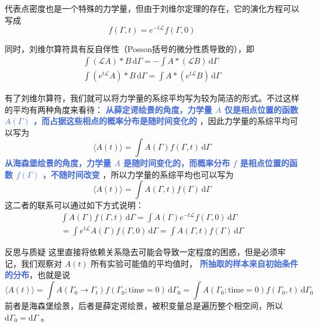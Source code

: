 代表点密度也是一个特殊的力学量，但由于刘维尔定理的存在，它的演化方程可以写成
\begin{equation}\label{equ:代表点密度的演化方程}
    f(\Gamma,t) =  e^{-t\mathcal{L}}f(\Gamma,0)
\end{equation}

同时，刘维尔算符具有反自伴性（Posson括号的微分性质导致的），即
\begin{align}\label{equ:反自伴性}
    \int (\mathcal{L}A)*B \,\mathrm{d}\Gamma= -\int A*(\mathcal{L}B) \,\mathrm{d}\Gamma \\
    \int (e^{t\mathcal{L}}A)*B \,\mathrm{d}\Gamma= \int A*(e^{t\mathcal{L}}B) \,\mathrm{d}\Gamma
\end{align}

有了刘维尔算符，我们就可以将力学量的系综平均写为较为简洁的形式。不过这样的平均有两种角度来看待： \textcolor{RoyalBlue}{\textbf{\kaishu 从薛定谔绘景的角度，力学量 $A$ 仅是相点位置的函数 $A(\Gamma)$ ，而占据这些相点的概率分布是随时间变化的}} ，因此力学量的系综平均可以写为
\begin{equation}\label{equ:力学量的系综平均，薛定谔绘景}
    \langle A(t) \rangle = \int A(\Gamma) f(\Gamma, t) \,\mathrm{d}\Gamma
\end{equation}
\textcolor{RoyalBlue}{\textbf{\kaishu 从海森堡绘景的角度，力学量 $A$ 是随时间变化的，而概率分布 $f$ 是相点位置的函数 $f(\Gamma)$ ，不随时间改变}} ，所以力学量的系综平均也可以写为
\begin{equation}\label{equ:力学量的系综平均，海森堡绘景}
    \langle A(t) \rangle = \int A(\Gamma,t) f(\Gamma) \,\mathrm{d}\Gamma
\end{equation}
这二者的联系可以通过如下方式说明：
\begin{align*}
    \int A(\Gamma) f(\Gamma, t) \,\mathrm{d}\Gamma = \int A(\Gamma) e^{-t\mathcal{L}}f(\Gamma,0) \,\mathrm{d}\Gamma \\
    = \int e^{t\mathcal{L}}A(\Gamma) f(\Gamma,0) \,\mathrm{d}\Gamma = \int A(\Gamma,t) f(\Gamma) \,\mathrm{d}\Gamma
\end{align*}
\begin{justification}{\kaishu 反思与质疑}
\kaishu \fontsize{11pt}{16pt}
    这里直接将依赖关系隐去可能会导致一定程度的困惑，但是必须牢记，我们观察对 $A(t)$ 所有实验可能值的平均值时， \textcolor{RoyalBlue}{\textbf{\kaishu  所抽取的样本来自初始条件的分布}}，也就是说
    \[
        \langle A(t) \rangle = \int A(\Gamma_0\rightarrow \Gamma_t) f(\Gamma_0; \text{time} = 0) \,\mathrm{d}\Gamma_0 = \int A(\Gamma_0;\text{time} = 0) f(\Gamma_0,t) \,\mathrm{d}\Gamma_0
    \]
    前者是海森堡绘景，后者是薛定谔绘景，被积变量总是遍历整个相空间，所以 $\mathrm{d}\Gamma_0 = \mathrm{d}\Gamma$ 。
\end{justification}

